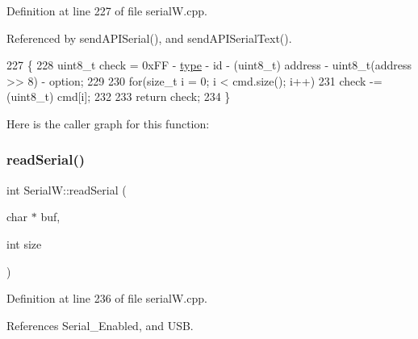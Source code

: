 Definition at line 227 of file serial\+W.\+cpp.



Referenced by send\+A\+P\+I\+Serial(), and send\+A\+P\+I\+Serial\+Text().


\begin{DoxyCode}
227                                                                                                            
      \{
228     uint8\_t check = 0xFF - \hyperlink{classstd_1_1conditional_1_1type}{type} - \textcolor{keywordtype}{id} - (uint8\_t) address - uint8\_t(address >> 8) - option;
229 
230     \textcolor{keywordflow}{for}(\textcolor{keywordtype}{size\_t} i = 0; i < cmd.size(); i++)
231             check -= (uint8\_t) cmd[i];
232 
233     \textcolor{keywordflow}{return} check;
234 \}
\end{DoxyCode}
Here is the caller graph for this function\+:
\mbox{\label{class_serial_w_a94d4f4ad3623e70c47f45ca5f16ba5e5}} 
\subsubsection{\texorpdfstring{read\+Serial()}{readSerial()}}
{\footnotesize\ttfamily int Serial\+W\+::read\+Serial (\begin{DoxyParamCaption}\item[{char $\ast$}]{buf,  }\item[{int}]{size }\end{DoxyParamCaption})}



Definition at line 236 of file serial\+W.\+cpp.



References Serial\+\_\+\+Enabled, and U\+SB.


